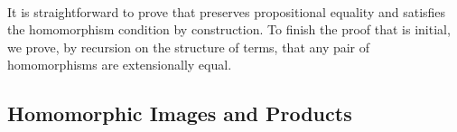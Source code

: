 \begin{code}
  \>[0]\AgdaSpace{}%
  \AgdaSymbol{:}\AgdaSpace{}%
  \AgdaSpace{}%
  \AgdaSymbol{\{}\AgdaSymbol{\}}\AgdaSpace{}%
  \AgdaSpace{}%
    \AgdaSymbol{(}
  \AgdaSpace{}\AgdaSymbol{:}\AgdaSpace{}%
  \AgdaSpace{}
  \AgdaSymbol{)}
    \AgdaSpace{}%
  \AgdaSymbol{\{}\AgdaSpace{}\AgdaSpace{}%
  \AgdaSymbol{:}\AgdaSpace{}%
  \AgdaSpace{}%
  \AgdaSpace{}\AgdaSymbol{\}}\AgdaSpace{}%
  \AgdaSpace{}%
  \AgdaSpace{}%
  \AgdaSpace{}%
    \AgdaSpace{}%
  \AgdaSpace{}
   \AgdaSpace{}%
  \AgdaSpace{}%
    \AgdaSpace{}%
    \AgdaSpace{}%
  \AgdaSpace{}\AgdaSpace{}%
  \<%
  \\
  \>[0]\AgdaSpace{}%
   \AgdaSpace{}%
  \AgdaSymbol{(}
    \AgdaSpace{}\AgdaSpace{}
    \AgdaSymbol{)}\AgdaSpace{}%
    \AgdaSymbol{=}\AgdaSpace{}%
       \AgdaSpace{}%
  \AgdaSpace{}%
    \AgdaSpace{}%
    \AgdaSpace{}%
  \AgdaSpace{}%
  \AgdaSymbol{(}
  \AgdaSpace{}
  \AgdaSymbol{)}
  \<%
\end{code}

\noindent It is straightforward to prove that  preserves
propositional equality and satisfies the homomorphism condition by
construction. To finish the proof that   is
initial, we prove, by recursion on the structure of terms, that any pair of
homomorphisms are extensionally equal.

\subsection{Homomorphic Images and Products}
\label{sec:homom-imag-prod}

